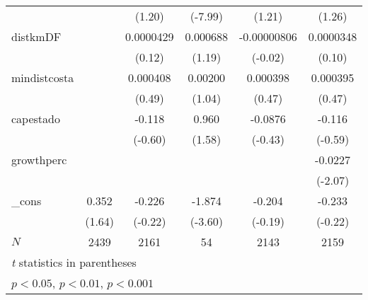 {\begin{tabular}{l*{5}{c}}
            &                     &      (1.20)         &     (-7.99)         &      (1.21)         &      (1.26)         \\
[1em]
distkmDF    &                     &   0.0000429         &    0.000688         & -0.00000806         &   0.0000348         \\
            &                     &      (0.12)         &      (1.19)         &     (-0.02)         &      (0.10)         \\
[1em]
mindistcosta&                     &    0.000408         &     0.00200         &    0.000398         &    0.000395         \\
            &                     &      (0.49)         &      (1.04)         &      (0.47)         &      (0.47)         \\
[1em]
capestado   &                     &      -0.118         &       0.960         &     -0.0876         &      -0.116         \\
            &                     &     (-0.60)         &      (1.58)         &     (-0.43)         &     (-0.59)         \\
[1em]
growthperc  &                     &                     &                     &                     &     -0.0227\sym{*}  \\
            &                     &                     &                     &                     &     (-2.07)         \\
[1em]
\_cons      &       0.352         &      -0.226         &      -1.874\sym{***}&      -0.204         &      -0.233         \\
            &      (1.64)         &     (-0.22)         &     (-3.60)         &     (-0.19)         &     (-0.22)         \\
\hline
\(N\)       &        2439         &        2161         &          54         &        2143         &        2159         \\
\hline\hline
\multicolumn{6}{l}{\footnotesize \textit{t} statistics in parentheses}\\
\multicolumn{6}{l}{\footnotesize \sym{*} \(p<0.05\), \sym{**} \(p<0.01\), \sym{***} \(p<0.001\)}\\
\end{tabular}
}
